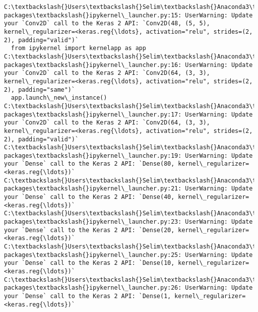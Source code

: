 \documentclass[11pt]{article}
\begin{document}
\begin{Verbatim}[commandchars=\\\{\}]
C:\textbackslash{}Users\textbackslash{}Selim\textbackslash{}Anaconda3\textbackslash{}envs\textbackslash{}tfenv\textbackslash{}lib\textbackslash{}site-packages\textbackslash{}ipykernel\_launcher.py:15: UserWarning: Update your `Conv2D` call to the Keras 2 API: `Conv2D(48, (5, 5), kernel\_regularizer=<keras.reg{\ldots}, activation="relu", strides=(2, 2), padding="valid")`
  from ipykernel import kernelapp as app
C:\textbackslash{}Users\textbackslash{}Selim\textbackslash{}Anaconda3\textbackslash{}envs\textbackslash{}tfenv\textbackslash{}lib\textbackslash{}site-packages\textbackslash{}ipykernel\_launcher.py:16: UserWarning: Update your `Conv2D` call to the Keras 2 API: `Conv2D(64, (3, 3), kernel\_regularizer=<keras.reg{\ldots}, activation="relu", strides=(2, 2), padding="same")`
  app.launch\_new\_instance()
C:\textbackslash{}Users\textbackslash{}Selim\textbackslash{}Anaconda3\textbackslash{}envs\textbackslash{}tfenv\textbackslash{}lib\textbackslash{}site-packages\textbackslash{}ipykernel\_launcher.py:17: UserWarning: Update your `Conv2D` call to the Keras 2 API: `Conv2D(64, (3, 3), kernel\_regularizer=<keras.reg{\ldots}, activation="relu", strides=(2, 2), padding="valid")`
C:\textbackslash{}Users\textbackslash{}Selim\textbackslash{}Anaconda3\textbackslash{}envs\textbackslash{}tfenv\textbackslash{}lib\textbackslash{}site-packages\textbackslash{}ipykernel\_launcher.py:19: UserWarning: Update your `Dense` call to the Keras 2 API: `Dense(80, kernel\_regularizer=<keras.reg{\ldots})`
C:\textbackslash{}Users\textbackslash{}Selim\textbackslash{}Anaconda3\textbackslash{}envs\textbackslash{}tfenv\textbackslash{}lib\textbackslash{}site-packages\textbackslash{}ipykernel\_launcher.py:21: UserWarning: Update your `Dense` call to the Keras 2 API: `Dense(40, kernel\_regularizer=<keras.reg{\ldots})`
C:\textbackslash{}Users\textbackslash{}Selim\textbackslash{}Anaconda3\textbackslash{}envs\textbackslash{}tfenv\textbackslash{}lib\textbackslash{}site-packages\textbackslash{}ipykernel\_launcher.py:23: UserWarning: Update your `Dense` call to the Keras 2 API: `Dense(20, kernel\_regularizer=<keras.reg{\ldots})`
C:\textbackslash{}Users\textbackslash{}Selim\textbackslash{}Anaconda3\textbackslash{}envs\textbackslash{}tfenv\textbackslash{}lib\textbackslash{}site-packages\textbackslash{}ipykernel\_launcher.py:25: UserWarning: Update your `Dense` call to the Keras 2 API: `Dense(10, kernel\_regularizer=<keras.reg{\ldots})`
C:\textbackslash{}Users\textbackslash{}Selim\textbackslash{}Anaconda3\textbackslash{}envs\textbackslash{}tfenv\textbackslash{}lib\textbackslash{}site-packages\textbackslash{}ipykernel\_launcher.py:26: UserWarning: Update your `Dense` call to the Keras 2 API: `Dense(1, kernel\_regularizer=<keras.reg{\ldots})`

\end{Verbatim}
\end{document}
